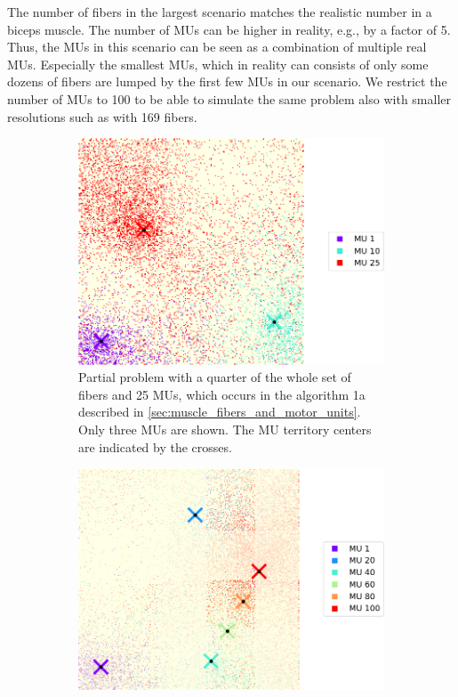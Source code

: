 The number of fibers in the largest scenario matches the realistic number in a biceps muscle. The number of MUs can be higher in reality, e.g., by a factor of 5. Thus, the MUs in this scenario can be seen as a combination of multiple real MUs. Especially the smallest MUs, which in reality can consists of only some dozens of fibers are lumped by the first few MUs in our scenario. We restrict the number of MUs to 100 to be able to simulate the same problem also with smaller resolutions such as with 169 fibers.

\begin{figure}
  \centering%
  \begin{subfigure}[t]{0.47\textwidth}%
    \centering%
    \includegraphics[width=\textwidth]{images/results/application/MU_fibre_distribution_523x523_100mus_txt_0_2d_fiber_distribution_.png}%
    \caption{Partial problem with a quarter of the whole set of fibers and 25 MUs, which occurs in the algorithm 1a described in \cref{sec:muscle_fibers_and_motor_units}. Only three MUs are shown. The MU territory centers are indicated by the crosses.}%
    \label{fig:mu_assignment_part0}%
  \end{subfigure} \quad
  \begin{subfigure}[t]{0.47\textwidth}%
    \centering%
    \includegraphics[width=\textwidth]{images/results/application/MU_fibre_distribution_523x523_100mus_txt_2d_fiber_distribution_.png}%

\end{subfigure}
\end{figure}
